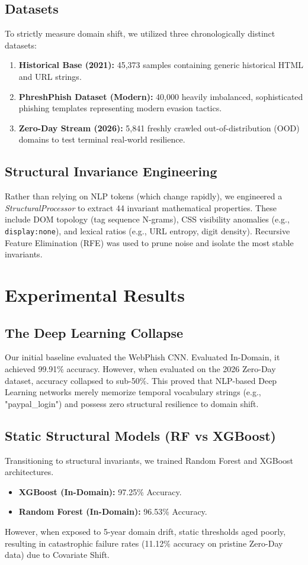 \documentclass[10pt,twocolumn,letterpaper]{article}
\begin{document}
\subsection{Datasets}
To strictly measure domain shift, we utilized three chronologically distinct datasets:
\begin{enumerate}
    \item \textbf{Historical Base (2021):} 45,373 samples containing generic historical HTML and URL strings.
    \item \textbf{PhreshPhish Dataset (Modern):} 40,000 heavily imbalanced, sophisticated phishing templates representing modern evasion tactics.
    \item \textbf{Zero-Day Stream (2026):} 5,841 freshly crawled out-of-distribution (OOD) domains to test terminal real-world resilience.
\end{enumerate}

\subsection{Structural Invariance Engineering}
Rather than relying on NLP tokens (which change rapidly), we engineered a \textit{StructuralProcessor} to extract 44 invariant mathematical properties. These include DOM topology (tag sequence N-grams), CSS visibility anomalies (e.g., \texttt{display:none}), and lexical ratios (e.g., URL entropy, digit density). Recursive Feature Elimination (RFE) was used to prune noise and isolate the most stable invariants.

\section{Experimental Results}

\subsection{The Deep Learning Collapse}
Our initial baseline evaluated the WebPhish CNN. Evaluated In-Domain, it achieved 99.91\% accuracy. However, when evaluated on the 2026 Zero-Day dataset, accuracy collapsed to sub-50\%. This proved that NLP-based Deep Learning networks merely memorize temporal vocabulary strings (e.g., "paypal\_login") and possess zero structural resilience to domain shift.

\subsection{Static Structural Models (RF vs XGBoost)}
Transitioning to structural invariants, we trained Random Forest and XGBoost architectures. 
\begin{itemize}
    \item \textbf{XGBoost (In-Domain):} 97.25\% Accuracy.
    \item \textbf{Random Forest (In-Domain):} 96.53\% Accuracy.
\end{itemize}
However, when exposed to 5-year domain drift, static thresholds aged poorly, resulting in catastrophic failure rates (11.12\% accuracy on pristine Zero-Day data) due to Covariate Shift.
\end{document}
